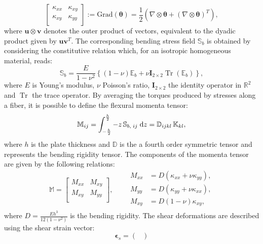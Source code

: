 \documentclass[preprint,12pt]{elsarticle}
\DeclareMathOperator{\Tr}{Tr}
\begin{document}
{\begin{equation}
\begin{bmatrix}
\kappa_{xx} &  \kappa_{xy}\\
\kappa_{xy} & \kappa_{yy} \\
\end{bmatrix} := \mathrm{Grad}(\bm{\theta}) =  \frac{1}{2} \left(\nabla \otimes \bm{\theta} + \left(\nabla \otimes \bm{\theta}\right)^T \right),
\end{equation}
where $\bm{u} \otimes {\bm{v}}$ denotes the outer product of vectors, equivalent to the dyadic product given by $\bm{u}\bm{v}^T$. The corresponding bending  stress field $\mathbb{S}_b$ is obtained by considering the constitutive relation which, for an isotropic homogeneous material, reads:
\begin{equation}
	\mathbb{S}_{b} = \frac{E}{1-\nu^2} \left\{ (1-\nu) \mathbb{E}_b +\nu \bm{I}_{2 \times 2} \Tr(\mathbb{E}_b) \right\},
\end{equation}
where $E$ is Young's modulus, $\nu$ Poisson's ratio, $\bm{I}_{2 \times 2}$ the identity operator in $\mathbb{R}^2$ and $\Tr$ the trace operator. By averaging the torques produced by stresses along a fiber, it is possible to define the flexural momenta tensor:
\begin{equation}
\mathbb{M}_{ij} = \int_{-\frac{h}{2} }^{ \frac{h}{2} } -z \, \mathbb{S}_{b, \; ij} \d z = \mathbb{D}_{ijkl} \,  \mathbb{K}_{kl}, 
\end{equation}
where $h$ is the plate thickness and $\mathbb{D}$ is the a fourth order symmetric tensor and represents the bending rigidity tensor. The components of the momenta tensor are given by the following relations:
\begin{equation}
	\mathbb{M} = \begin{bmatrix}
	M_{xx} &  M_{xy}\\
	M_{xy} &  M_{yy} \\
	\end{bmatrix},  \qquad 
	\begin{aligned}
	M_{xx} &= D\left(\kappa_{xx} + \nu \kappa_{yy} \right),\\
	M_{yy} &= D\left(\kappa_{yy} + \nu \kappa_{xx} \right),\\
	M_{xy} &= D\left(1 - \nu \right) \kappa_{xy}, \\
	\end{aligned} 
\end{equation}
where $D = \frac{E h^3}{12 (1 - \nu^2)}$ is the bending rigidity. The shear deformations are described using the shear strain vector:
\begin{equation}	
\bm{\epsilon}_s = 
\begin{pmatrix}

\end{pmatrix}
\end{equation}}
\end{document}
